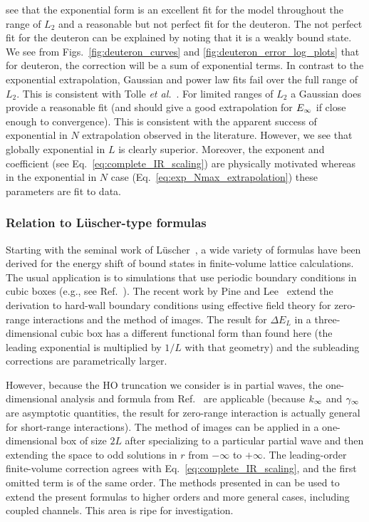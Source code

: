 	see that the exponential form is an excellent fit for the model
	throughout the range of $L_2$ and a reasonable but not perfect fit for
	the deuteron.  The not perfect fit for the deuteron can be explained
	by noting that it is a weakly bound state.  We see from
	Figs.~\ref{fig:deuteron_curves} and \ref{fig:deuteron_error_log_plots}
	that for deuteron, the correction will be a sum of exponential terms.
	In contrast to the exponential extrapolation, Gaussian and power law fits
	fail over the full range of $L_2$.  This is consistent with
	Tolle {\it et al.}~\cite{Tolle:2012cx}.  For limited ranges of $L_2$ a
	Gaussian does	provide a reasonable fit (and should give a good extrapolation
	for	$E_{\infty}$ if close enough to convergence).  This is consistent with the
	apparent success of exponential in $N$ extrapolation observed in the
	literature.  However, we see that globally exponential in $L$ is clearly
	superior.  Moreover, the exponent and coefficient (see
	Eq.~\eqref{eq:complete_IR_scaling}) are physically motivated whereas in the
	exponential in $N$ case (Eq.~\eqref{eq:exp_Nmax_extrapolation}) these
	parameters are fit to data.


	\subsubsection{Relation to L\"{u}scher-type formulas}

	Starting with the seminal work of L\"uscher~\cite{Luscher:1985dn}, a
	wide variety of formulas have been derived for the energy shift of
	bound states in finite-volume lattice calculations.  The usual
	application is to simulations that use periodic boundary conditions in
	cubic boxes (e.g., see Ref.~\cite{Konig:2011ti}).  The recent work by
	Pine and Lee~\cite{Lee:2010km,Pine:2012zv} extend the derivation to
	hard-wall boundary conditions using effective field theory for
	zero-range interactions and the method of images.  The result for
	$\Delta E_L$ in a three-dimensional cubic box has a different
	functional form than found here (the leading exponential is multiplied
	by $1/L$ with that geometry) and the subleading corrections are
	parametrically larger.

	However, because the HO truncation we consider is in partial waves,
	the one-dimensional analysis and formula from Ref.~\cite{Pine:2012zv}
	are applicable (because $k_{\infty}$ and $\gamma_\infty$ are asymptotic quantities,
	the result for zero-range interaction is actually general for
	short-range interactions).  The method of images can be applied in a
	one-dimensional box of size $2L$ after specializing to a particular
	partial wave and then extending the space to odd solutions in $r$ from
	$-\infty$ to $+\infty$.  The leading-order finite-volume correction
	agrees with Eq.~\eqref{eq:complete_IR_scaling}, and the first omitted term
	is of the same order.
	The methods presented in \cite{Lee:2010km,Pine:2012zv}
	can be used to extend the present formulas to higher
	orders and more general cases, including coupled channels.  This area
	is ripe for investigation.

